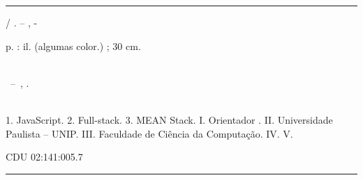 \documentclass[
	12pt,				%
	openright,			%
	twoside,			%
	a4paper,			%
	english,			%
	brazil				%
	]{abntex2}
\begin{document}
\frenchspacing 


\imprimircapa

\imprimirfolhaderosto*


%
%     
\begin{fichacatalografica}
	\vspace*{\fill}					%
	\hrule							%
	\begin{center}					%
	\begin{minipage}[c]{12.5cm}		%
	
	\imprimirautor
	
	\hspace{0.5cm} \imprimirtitulo  / \imprimirautor. --
	\imprimirlocal, \imprimirdata-
	
	\hspace{0.5cm} \pageref{LastPage} p. : il. (algumas color.) ; 30 cm.\\
	
	\hspace{0.5cm} \imprimirorientadorRotulo~\imprimirorientador\\
	
	\hspace{0.5cm}
	\parbox[t]{\textwidth}{\imprimirtipotrabalho~--~\imprimirinstituicao,
	\imprimirdata.}\\
	
	\hspace{0.5cm}
		1. JavaScript.
        2. Full-stack.
        3. MEAN Stack.
		I. Orientador \imprimirorientador.
		II. Universidade Paulista -- UNIP.
		III. Faculdade de Ciência da Computação.
		IV. \imprimirtitulo 
		V. \imprimirautor
	
	\hspace{8.75cm} CDU 02:141:005.7\\
	
	\end{minipage}
	\end{center}
	\hrule
\end{fichacatalografica}
\end{document}
